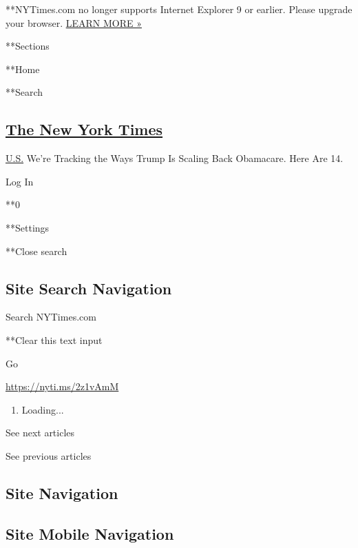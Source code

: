  **NYTimes.com no longer supports Internet Explorer 9 or earlier. Please
upgrade your browser.
\href{http://www.nytimes3xbfgragh.onion/content/help/site/ie9-support.html}{LEARN
MORE »}

**Sections

**Home

**Search

\hypertarget{the-new-york-times}{%
\subsection{\texorpdfstring{\href{http://www.nytimes3xbfgragh.onion/}{The
New York Times}}{The New York Times}}\label{the-new-york-times}}

 \href{https://www.nytimes3xbfgragh.onion/section/us}{U.S.}
\textbar{}We're Tracking the Ways Trump Is Scaling Back Obamacare. Here
Are 14.

Log In

**0

**Settings

**Close search

\hypertarget{site-search-navigation}{%
\subsection{Site Search Navigation}\label{site-search-navigation}}

Search NYTimes.com

**Clear this text input

Go

\url{https://nyti.ms/2z1vAmM}

\begin{enumerate}
\def\labelenumi{\arabic{enumi}.}
\item
  Loading...
\end{enumerate}

See next articles

See previous articles

\hypertarget{site-navigation}{%
\subsection{Site Navigation}\label{site-navigation}}

\hypertarget{site-mobile-navigation}{%
\subsection{Site Mobile Navigation}\label{site-mobile-navigation}}

